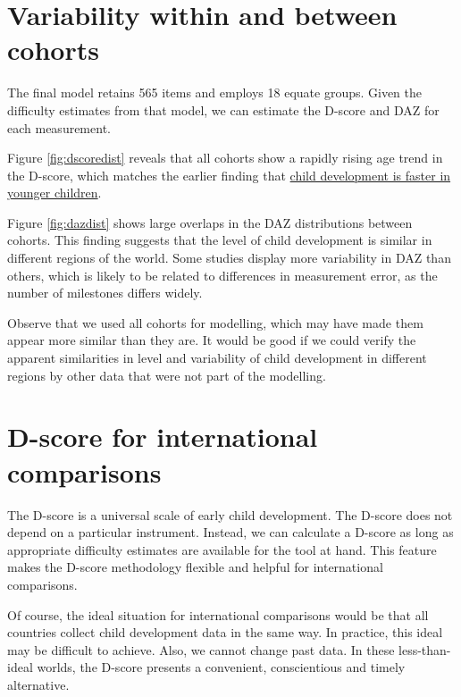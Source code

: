 \documentclass[
]{book}
\begin{document}
\hypertarget{sec:variability}{%
\section{Variability within and between cohorts}\label{sec:variability}}

The final model retains 565 items and employs 18 equate groups. Given the difficulty estimates from that model, we can estimate the D-score and DAZ for each measurement.

Figure \ref{fig:dscoredist} reveals that all cohorts show a rapidly rising age trend in the D-score, which matches the earlier finding that \href{https://d-score.org/dbook1/sec-probage.html}{child development is faster in younger children}.

Figure \ref{fig:dazdist} shows large overlaps in the DAZ distributions between cohorts. This finding suggests that the level of child development is similar in different regions of the world. Some studies display more variability in DAZ than others, which is likely to be related to differences in measurement error, as the number of milestones differs widely.

Observe that we used all cohorts for modelling, which may have made them appear more similar than they are. It would be good if we could verify the apparent similarities in level and variability of child development in different regions by other data that were not part of the modelling.

\hypertarget{sec:internationalcomparisons}{%
\section{D-score for international comparisons}\label{sec:internationalcomparisons}}

The D-score is a universal scale of early child development. The D-score does not depend on a particular instrument. Instead, we can calculate a D-score as long as appropriate difficulty estimates are available for the tool at hand. This feature makes the D-score methodology flexible and helpful for international comparisons.

Of course, the ideal situation for international comparisons would be that all countries collect child development data in the same way. In practice, this ideal may be difficult to achieve. Also, we cannot change past data. In these less-than-ideal worlds, the D-score presents a convenient, conscientious and timely alternative.
\end{document}
